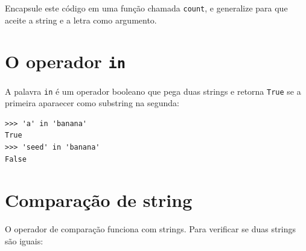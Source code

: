 {\begin{ex}


Encapsule este código em uma função chamada {\tt count}, e generalize para
que aceite a string e a letra como argumento.
\end{ex}

\section{O operador {\tt in}}
\label{inboth}



A palavra {\tt in} é um operador booleano que pega duas strings e retorna
{\tt True} se a primeira aparaecer como substring na segunda:

\beforeverb
\begin{verbatim}
>>> 'a' in 'banana'
True
>>> 'seed' in 'banana'
False
\end{verbatim}
\afterverb
%

\section{Comparação de string}



O operador de comparação funciona com strings. Para verificar se duas strings
são iguais:

}
